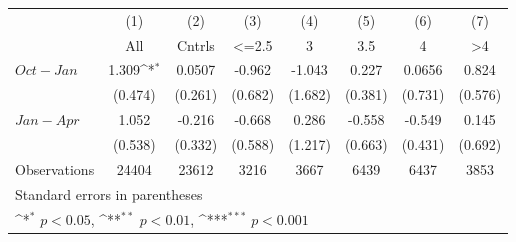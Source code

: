 {
\def\sym#1{\ifmmode^{#1}\else\(^{#1}\)\fi}
\begin{tabular}{l*{7}{c}}
\hline\hline
                    &\multicolumn{1}{c}{(1)}&\multicolumn{1}{c}{(2)}&\multicolumn{1}{c}{(3)}&\multicolumn{1}{c}{(4)}&\multicolumn{1}{c}{(5)}&\multicolumn{1}{c}{(6)}&\multicolumn{1}{c}{(7)}\\
                    &\multicolumn{1}{c}{All}&\multicolumn{1}{c}{Cntrls}&\multicolumn{1}{c}{<=2.5}&\multicolumn{1}{c}{3}&\multicolumn{1}{c}{3.5}&\multicolumn{1}{c}{4}&\multicolumn{1}{c}{>4}\\
\hline
$ Oct-Jan $         &       1.309\sym{*}  &      0.0507         &      -0.962         &      -1.043         &       0.227         &      0.0656         &       0.824         \\
                    &     (0.474)         &     (0.261)         &     (0.682)         &     (1.682)         &     (0.381)         &     (0.731)         &     (0.576)         \\
[1em]
$ Jan-Apr $         &       1.052         &      -0.216         &      -0.668         &       0.286         &      -0.558         &      -0.549         &       0.145         \\
                    &     (0.538)         &     (0.332)         &     (0.588)         &     (1.217)         &     (0.663)         &     (0.431)         &     (0.692)         \\
\hline
Observations        &       24404         &       23612         &        3216         &        3667         &        6439         &        6437         &        3853         \\
\hline\hline
\multicolumn{8}{l}{\footnotesize Standard errors in parentheses}\\
\multicolumn{8}{l}{\footnotesize \sym{*} \(p<0.05\), \sym{**} \(p<0.01\), \sym{***} \(p<0.001\)}\\
\end{tabular}
}
